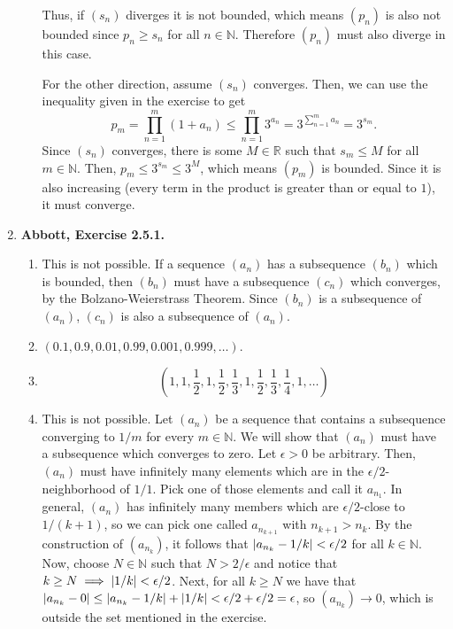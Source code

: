 \documentclass{article}
\DeclarePairedDelimiter\abs{\lvert}{\rvert}
\newcommand{\N}{\mathbb{N}}
\newcommand{\R}{\mathbb{R}}
\newcommand{\ra}{\rightarrow}
\newcommand{\exc}[2][Abbott]{\item \textbf{#1, Exercise #2.}}
\newcommand{\lep}[1][L]{#1et $\epsilon > 0$ be arbitrary}
\begin{document}
\begin{enumerate}
\begin{enumerate}
        Thus, if $(s_n)$ diverges it is not bounded, which means $(p_n)$ is also not bounded since $p_n \geq s_n$ for all $n \in \N$. Therefore $(p_n)$ must also diverge in this case.
        
        For the other direction, assume $(s_n)$ converges. Then, we can use the inequality given in the exercise to get 
        \begin{equation*}
            p_m = \prod_{n=1}^m (1+a_n) \leq \prod_{n=1}^m 3^{a_n} 
            = 3^{\sum\limits_{n=1}^m a_n} = 3^{s_m}.
        \end{equation*} Since $(s_n)$ converges, there is some $M \in \R$ such that $s_m \leq M$ for all $m \in \N$. Then, $p_m \leq 3^{s_m}\leq 3^M$, which means $(p_m)$ is bounded. Since it is also increasing (every term in the product is greater than or equal to $1$), it must converge.
    \end{enumerate}
    
    \exc{2.5.1}
    \begin{enumerate}
        \item This is not possible. If a sequence $(a_n)$ has a subsequence $(b_n)$ which is bounded, then $(b_n)$ must have a subsequence $(c_n)$ which converges, by the Bolzano-Weierstrass Theorem. Since $(b_n)$ is a subsequence of $(a_n)$, $(c_n)$ is also a subsequence of $(a_n)$.
        
        \item $(0.1,0.9,0.01,0.99,0.001,0.999, \dots)$.
        
        \item \begin{equation*}
            (1, 1, \frac{1}{2}, 1, \frac{1}{2}, \frac{1}{3}, 1, \frac{1}{2}, \frac{1}{3}, \frac{1}{4}, 1, \dots)
        \end{equation*}
        
        \item This is not possible. Let $(a_n)$ be a sequence that contains a subsequence converging to $1/m$ for every $m \in \N$. We will show that $(a_n)$ must have a subsequence which converges to zero. \lep. Then, $(a_n)$ must have infinitely many elements which are in the $\epsilon/2$-neighborhood of $1/1$. Pick one of those elements and call it $a_{n_1}$. In general, $(a_n)$ has infinitely many members which are $\epsilon/2$-close to $1/(k+1)$, so we can pick one called $a_{n_{k+1}}$ with $n_{k+1} > n_k$. By the construction of $(a_{n_k})$, it follows that $\abs*{a_{n_k} - 1/k} < \epsilon/2$ for all $k \in \N$. Now, choose $N \in \N$ such that $N > 2/\epsilon$ and notice that $k \geq N \implies \abs*{1/k} < \epsilon/2$. Next, for all $k \geq N$ we have that $\abs*{a_{n_k}-0} \leq \abs*{a_{n_k}-1/k}+\abs*{1/k} < \epsilon/2 + \epsilon/2 = \epsilon$, so $(a_{n_k}) \ra 0$, which is outside the set mentioned in the exercise.
    \end{enumerate}
    

\end{enumerate}
\end{document}
